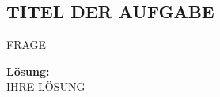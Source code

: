 \documentclass[11pt,a4paper,DIV=12]{scrartcl}
\date{\today}
\author{Julian Schindler\\ (1992822)}
\newcommand{\loesung}{\textbf{Lösung:}\\}
\begin{document}
\maketitle       %

\subsection{TITEL DER AUFGABE}

FRAGE

\loesung
IHRE LÖSUNG

\end{document}
